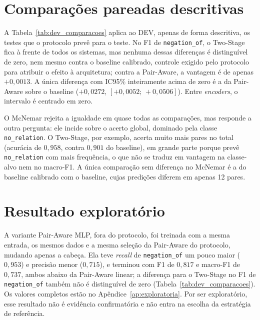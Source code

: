 \section{Comparações pareadas descritivas}
\label{sec:resultados_comparacoes}

A Tabela~\ref{tab:dev_comparacoes} aplica ao DEV, apenas de forma descritiva, os
testes que o protocolo prevê para o teste. No F1 de \texttt{negation\_of}, o
Two-Stage fica à frente de todos os sistemas, mas nenhuma dessas diferenças é
distinguível de zero, nem mesmo contra o baseline calibrado, controle exigido pelo
protocolo para atribuir o efeito à arquitetura; contra a Pair-Aware, a vantagem é de
apenas $+0{,}0013$. A única diferença com IC95\% inteiramente acima de zero é a da
Pair-Aware sobre o baseline ($+0{,}0272$, $[+0{,}0052;\,+0{,}0506]$). Entre
\emph{encoders}, o intervalo é centrado em zero.



O McNemar rejeita a igualdade em quase todas as comparações, mas responde a outra
pergunta: ele incide sobre o acerto global, dominado pela classe
\texttt{no\_relation}. O Two-Stage, por exemplo, acerta muito mais pares no total
(acurácia de $0{,}958$, contra $0{,}901$ do baseline), em grande parte porque prevê
\texttt{no\_relation} com mais frequência, o que não se traduz em vantagem na
classe-alvo nem no macro-F1. A única comparação sem diferença no McNemar é a do
baseline calibrado com o baseline, cujas predições diferem em apenas 12 pares.

\section{Resultado exploratório}
\label{sec:resultados_exploratorios}

A variante Pair-Aware MLP, fora do protocolo, foi treinada com a mesma entrada, os
mesmos dados e a mesma seleção da Pair-Aware do protocolo, mudando apenas a cabeça.
Ela teve \emph{recall} de \texttt{negation\_of} um pouco maior ($0{,}953$) e precisão
menor ($0{,}715$), e terminou com F1 de $0{,}817$ e macro-F1 de $0{,}737$, ambos abaixo
da Pair-Aware linear; a diferença para o Two-Stage no F1 de \texttt{negation\_of}
também não é distinguível de zero (Tabela~\ref{tab:dev_comparacoes}). Os valores
completos estão no Apêndice~\ref{ap:exploratoria}. Por ser exploratório, esse
resultado não é evidência confirmatória e não entra na escolha da estratégia de
referência.
